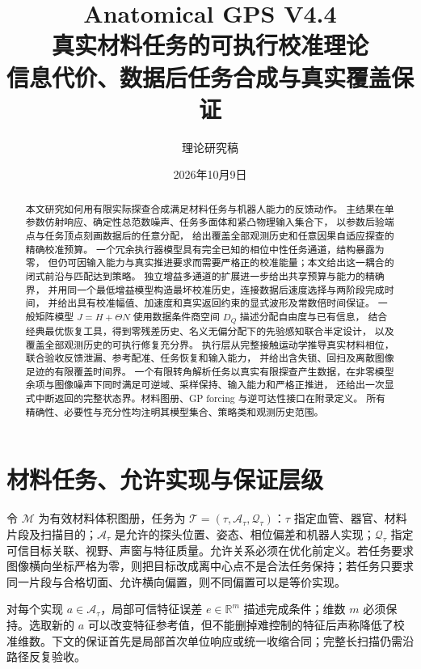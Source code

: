 \documentclass[11pt,a4paper]{article}
\numberwithin{equation}{section}
\theoremstyle{definition}
\newcommand{\R}{\mathbb R}
\begin{document}
\title{Anatomical GPS V4.4\\[3mm]
\Large 真实材料任务的可执行校准理论\\[2mm]
\large 信息代价、数据后任务合成与真实覆盖保证}
\author{理论研究稿}
\date{2026年10月9日}
\maketitle
\begin{abstract}
本文研究如何用有限实际探查合成满足材料任务与机器人能力的反馈动作。
主结果在单参数仿射响应、确定性总范数噪声、任务多面体和紧凸物理输入集合下，
以参数后验端点与任务顶点刻画数据后的任意分配，
给出覆盖全部观测历史和任意因果自适应探查的精确校准预算。
一个冗余执行器模型具有完全已知的相位中性任务通道，结构暴露为零，
但仍可因输入能力与真实推进要求而需要严格正的校准能量；本文给出这一耦合的闭式前沿与匹配达到策略。
独立增益多通道的扩展进一步给出共享预算与能力的精确界，
并用同一个最低增益模型构造最坏校准历史，连接数据后速度选择与两阶段完成时间，
并给出具有校准幅值、加速度和真实返回约束的显式波形及常数倍时间保证。
一般矩阵模型 $J=H+\Theta N$ 使用数据条件商空间 $D_Q$ 描述分配自由度与已有信息，
结合经典最优恢复工具，得到零残差历史、名义无偏分配下的先验感知联合半定设计，
以及覆盖全部观测历史的可执行修复充分界。
执行层从完整接触运动学推导真实材料相位，联合验收反馈泄漏、参考配准、任务恢复和输入能力，
并给出含失锁、回扫及离散图像足迹的有限覆盖时间界。
一个有限转角解析任务以真实有限探查产生数据，在非零模型余项与图像噪声下同时满足可逆域、采样保持、输入能力和严格正推进，
还给出一次显式中断返回的完整状态界。材料图册、GP forcing 与逆可达性接口在附录定义。
所有精确性、必要性与充分性均注明其模型集合、策略类和观测历史范围。
\end{abstract}
\newpage
\begingroup\footnotesize\setlength{\parskip}{0pt}\tableofcontents\endgroup
\newpage
\section{材料任务、允许实现与保证层级}\label{sec:rev:task}
令 $\mathcal M$ 为有效材料体积图册，任务为 $\mathcal T=(\tau,\mathcal A_\tau,\mathcal Q_\tau)$：$\tau$ 指定血管、器官、材料片段及扫描目的；$\mathcal A_\tau$ 是允许的探头位置、姿态、相位偏差和机器人实现；$\mathcal Q_\tau$ 指定可信目标关联、视野、声窗与特征质量。允许关系必须在优化前定义。若任务要求图像横向坐标严格为零，则把目标改成离中心点不是合法任务保持；若任务只要求同一片段与合格切面、允许横向偏置，则不同偏置可以是等价实现。

对每个实现 $a\in\mathcal A_\tau$，局部可信特征误差 $e\in\R^m$ 描述完成条件；维数 $m$ 必须保持。选取新的 $a$ 可以改变特征参考值，但不能删掉难控制的特征后声称降低了校准维数。下文的保证首先是局部首次单位响应或统一收缩合同；完整长扫描仍需沿路径反复验收。
\end{document}
